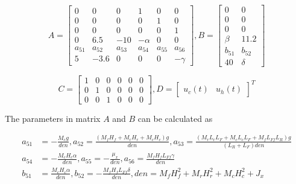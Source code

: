 \documentclass[hyperref]{article}
\theoremstyle{nonumberplain}
\begin{document}
	\begin{equation}
		A=\begin{bmatrix}
		0 &0  &0  &1  &0  &0 \\ 
		0 &0  &0  &0  &1  &0 \\ 
		0 &0  &0  &0  &0  &1 \\ 
		0 &6.5  &-10  &-\alpha   &0  &0 \\ 
		a_{51} &a_{52}  &a_{53}  &a_{54}  &a_{55}  &a_{56} \\ 
		5 &-3.6  &0  &0  &0  &-\gamma  
		\end{bmatrix}, 
		B=\begin{bmatrix}
		0 &0 \\ 
		0 &0 \\ 
		0 &0 \\ 
		\beta  &11.2 \\ 
		b_{51} &b_{52} \\ 
		40 &\delta  
		\end{bmatrix}
	\label{eq3}
	\end{equation}
	
	\begin{equation}
		C=\begin{bmatrix}
		1 &0  &0  &0  &0  &0 \\ 
		0 &1  &0  &0  &0  &0 \\ 
		0 &0  &1  &0  &0  &0 
		\end{bmatrix},
		D=\begin{bmatrix}
		u_{c}(t) &u_{h}(t) 
		\end{bmatrix}^{T}
	\label{eq4}
	\end{equation}
	
	The parameters in matrix $A$ and $B$ can be calculated as
	
	\begin{equation}
	\begin{split}
			a_{51}&=-\frac{M_{c}g}{den},
			a_{52}=\frac{(M_{f}H_{f}+M_{r}H_{r}+M_{c}H_{c})g}{den}, 
			a_{53}=\frac{(M_{r}L_{r}L_{F}+M_{c}L_{c}L_{F}+M_{f}L_{Ff}L_{R})g}{(L_{R}+L_{F})den}\\
			a_{54}&=-\frac{M_{c}H_{c}\alpha}{den},
			a_{55}=-\frac{\mu _{x}}{den},
			a_{56}=\frac{M_{f}H_{f}L_{Ff}\gamma }{den}\\		
			b_{51}&=\frac{M_{c}H_{c}\alpha }{den},
			b_{52}=-\frac{M_{f}H_{f}L_{Ff}\delta }{den},
			den=M_{f}H_{f}^{2}+M_{r}H_{r}^2+M_{c}H_{c}^{2}+J_{x}
			\label{eq5}			
	\end{split}
	\end{equation}
	
\end{document}
